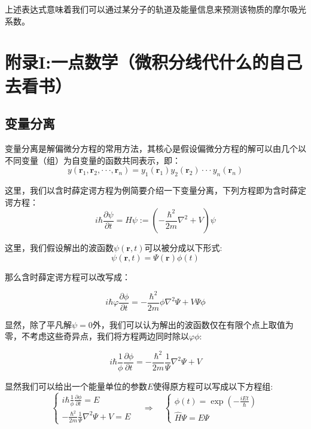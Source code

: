 上述表达式意味着我们可以通过某分子的轨道及能量信息来预测该物质的摩尔吸光系数。

\section{附录I:一点数学（微积分线代什么的自己去看书）}
\subsection{变量分离}
变量分离是解偏微分方程的常用方法，其核心是假设偏微分方程的解可以由几个以不同变量（组）为自变量的函数共同表示，即：
\[y(\bm{r}_1,\bm{r}_2,\cdot\cdot\cdot,\bm{r}_n)=y_1(\bm{r}_1)y_2(\bm{r}_2)\cdot\cdot\cdot y_n(\bm{r}_n)\]

这里，我们以含时薛定谔方程为例简要介绍一下变量分离，下列方程即为含时薛定谔方程：
\[i \hbar \frac{\partial \psi}{\partial t} =\hat{H}\psi:=\left (-\frac{\hbar^2}{2m}\nabla^2+V \right ) \psi\]

这里，我们假设解出的波函数$\psi(\bm{r},t)$可以被分成以下形式:
\[\psi(\bm{r},t)=\varPsi(\bm{r})\phi(t)\]

那么含时薛定谔方程可以改写成：

\[i \hbar \varphi \frac{\partial \phi}{\partial t}= -\frac{\hbar^2}{2m} \phi \nabla^2 \varPsi+V\varPsi\phi\]

显然，除了平凡解$\psi=0$外，我们可以认为解出的波函数仅在有限个点上取值为零，不考虑这些奇异点，我们将方程两边同时除以$\varphi$$\phi$:

\[i \hbar \frac{1}{\phi} \frac{\partial \phi}{\partial t}= -\frac{\hbar^2}{2m} \frac{1}{\varPsi} \nabla^2 \varPsi+V\]

显然我们可以给出一个能量单位的参数$E$使得原方程可以写成以下方程组:
\[\left\{
\begin{array}{r}
i\hbar\frac{1}{\phi}\frac{\partial\phi}{\partial t}=E\\
-\frac{\hbar^2}{2m}\frac{1}{\varPsi}\nabla^2\varPsi+V=E
\end{array} \right. \quad \Rightarrow \quad
\left\{
\begin{array}{l}
\phi(t)=\exp(-\frac{iEt}{\hbar})\\
\hat{H}\varPsi=E\varPsi
\end{array} \right.\]


